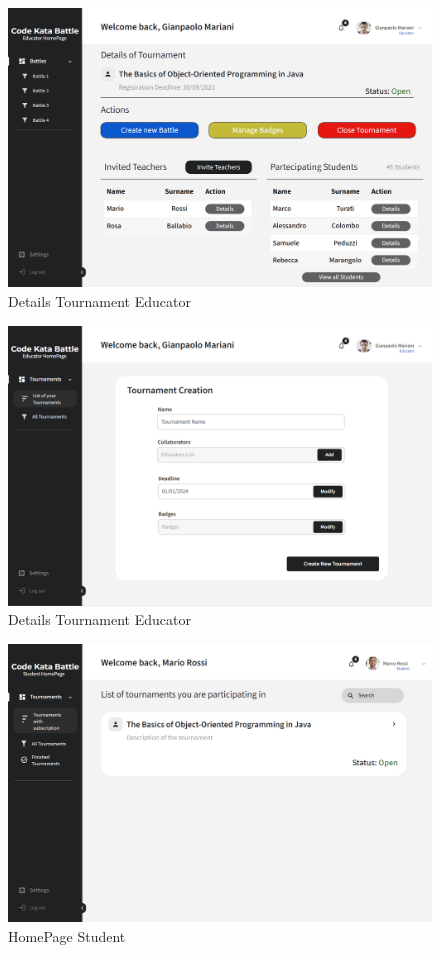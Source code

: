 \begin{figure}[H]
    \centering
    \includegraphics[width=\textwidth]{../images/details-tournament-educator.png}
    \caption{Details Tournament Educator}
    \label{fig:Details Tournament Educator}
\end{figure}
\begin{figure}[H]
    \centering
    \includegraphics[width=\textwidth]{../images/tournament-creation-educator.png}
    \caption{Details Tournament Educator}
    \label{fig:Details Tournament Educator}
\end{figure}
\begin{figure}[H]
    \centering
    \includegraphics[width=\textwidth]{../images/homepage-student.png}
    \caption{HomePage Student}
    \label{fig:HomePage Student}
\end{figure}
